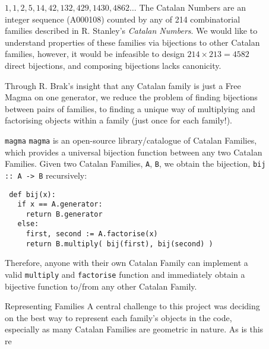 \documentclass[final]{beamer}
\newlength{\sepwidth}
\newlength{\colwidth}
\newcommand{\separatorcolumn}{\begin{column}{\sepwidth}\end{column}}
\newcommand{\getTri}[1]{\begin{tikzpicture}[line width=2pt, radius=3pt]\getdata{#1}\triangulations\end{tikzpicture}}
\newcommand{\getSP}[1]{\begin{tikzpicture}[line width=2.5pt, radius=4pt, scale=0.75]\getdata{#1}\staircasePolygons\end{tikzpicture}}
\newcommand{\getCBT}[1]{\scalebox{0.5}{\getdata{#1}\CBTs}}
\newcommand{\getArch}[1]{\begin{tikzpicture}[line width=2pt, radius=4pt, scale=0.75]\getdata{#1}\linkDiagrams\end{tikzpicture}}
\begin{document}
\begin{frame}[t]
\begin{columns}[t]
\begin{column}{\colwidth}
\end{column}

\separatorcolumn

\begin{column}{\colwidth}

  \begin{block}{$1, 1, 2, 5, 14, 42, 132, 429, 1430, 4862\dots$}
    The Catalan Numbers are an integer sequence (A000108) counted by any of 214 combinatorial families described in R. Stanley's \textit{Catalan Numbers}. We would like to understand properties of these families via bijections to other Catalan families, however, it would be infeasible to design $214 \times 213 = 4582$ direct bijections, and composing bijections lacks canonicity.

    Through R. Brak's insight that any Catalan family is just a Free Magma on one generator, we reduce the problem of finding bijections between pairs of families, to finding a unique way of multiplying and factorising objects within a family (just once for each family!). 
  \end{block}

  \begin{alertblock}{\texttt{magma}}
    \texttt{magma} is an open-source library/catalogue of Catalan Families, which provides a universal bijection function between any two Catalan Families. Given two Catalan Families, \texttt{A}, \texttt{B}, we obtain the bijection, \texttt{bij :: A -> B} recursively:
    
    \texttt{
    def bij(x):\\
    ~~~if x == A.generator:\\
    ~~~~~return B.generator\\
    ~~~else:\\
    ~~~~~first, second := A.factorise(x)\\
    ~~~~~return B.multiply( bij(first), bij(second) )}

    Therefore, anyone with their own Catalan Family can implement a valid \texttt{multiply} and \texttt{factorise} function and immediately obtain a bijective function to/from any other Catalan Family.
  \end{alertblock}

  \begin{block}{Representing Families}
    A central challenge to this project was deciding on the best way to represent each family's objects in the code, especially as many Catalan Families are geometric in nature. As is this re
  \end{block}

\end{column}

\separatorcolumn

\end{columns}


  
    
\end{frame}
\end{document}
